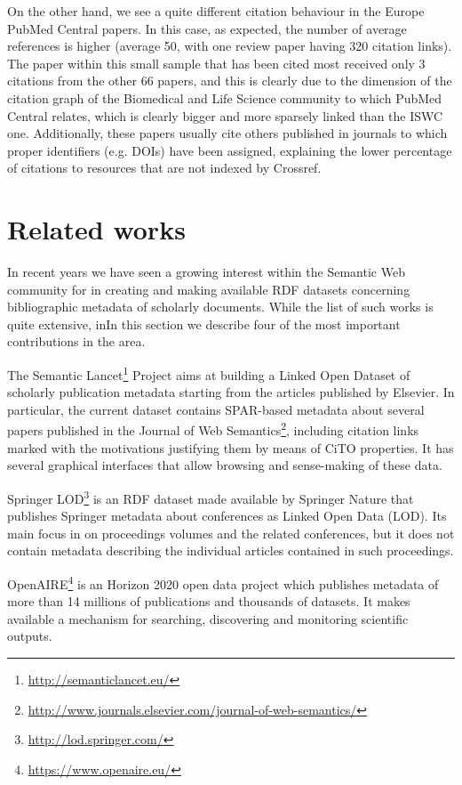 \documentclass[runningheads,a4paper]{llncs}
\begin{document}
On the other hand, we see a quite different citation behaviour in the Europe PubMed Central papers. In this case, as expected, the number of average references is higher (average 50, with one review paper having 320 citation links). The paper within this small sample that has been cited most received only 3 citations from the other 66 papers, and this is clearly due to the dimension of the citation graph of the Biomedical and Life Science community to which PubMed Central relates, which is clearly bigger and more sparsely linked than the ISWC one. Additionally, these papers usually cite others published in journals to which proper identifiers (e.g. DOIs) have been assigned, explaining the lower percentage of citations to resources that are not indexed by Crossref.

\section{Related works}\label{__RefHeading__5192_1890349413}

In recent years we have seen a growing interest within the Semantic Web community for in creating and making available RDF datasets concerning bibliographic metadata of scholarly documents. While the list of such works is quite extensive, inIn this section we describe four of the most important contributions in the area.

The Semantic Lancet\footnote{\url{http://semanticlancet.eu/}} Project  \cite{__RefNumPara__69_1852566440} aims at building a Linked Open Dataset of scholarly publication metadata starting from the articles published by Elsevier. In particular, the current dataset contains SPAR-based  \cite{__RefNumPara__17_1852566440} metadata about several papers published in the Journal of Web Semantics\footnote{\url{http://www.journals.elsevier.com/journal-of-web-semantics/}}, including citation links marked with the motivations justifying them by means of CiTO properties. It has several graphical interfaces that allow browsing and sense-making of these data.

Springer LOD\footnote{\url{http://lod.springer.com/}} \cite{__RefNumPara__5076_1890349413} is an RDF dataset made available by Springer Nature that publishes Springer metadata about conferences as Linked Open Data (LOD). Its main focus in on proceedings volumes and the related conferences, but it does not contain metadata describing the individual articles contained in such proceedings.

OpenAIRE\footnote{\url{https://www.openaire.eu/}} \cite{__RefNumPara__71_1852566440} is an Horizon 2020 open data project which publishes metadata of more than 14 millions of publications and thousands of datasets. It makes available a mechanism for searching, discovering and monitoring scientific outputs.
\end{document}
